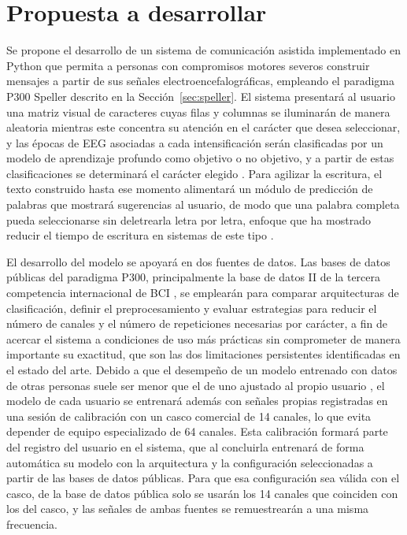 \chapter[PROPUESTA A DESARROLLAR]{Propuesta a desarrollar}
\label{cap:propuesta}

Se propone el desarrollo de un sistema de comunicación asistida implementado en Python que permita
a personas con compromisos motores severos construir mensajes a partir de sus señales
electroencefalográficas, empleando el paradigma P300 Speller descrito en la
Sección~\ref{sec:speller}. El sistema presentará al usuario una matriz visual de caracteres cuyas
filas y columnas se iluminarán de manera aleatoria mientras este concentra su atención en el
carácter que desea seleccionar, y las épocas de EEG asociadas a cada intensificación serán
clasificadas por un modelo de aprendizaje profundo como objetivo o no objetivo, y a partir de estas
clasificaciones se determinará el carácter elegido \cite{farwell1988}. Para agilizar la escritura,
el texto construido hasta ese momento alimentará un módulo de predicción de palabras que mostrará
sugerencias al usuario, de modo que una palabra completa pueda seleccionarse sin deletrearla letra
por letra, enfoque que ha mostrado reducir el tiempo de escritura en sistemas de este tipo
\cite{ryan2011,hong2026}.

El desarrollo del modelo se apoyará en dos fuentes de datos. Las bases de datos públicas del
paradigma P300, principalmente la base de datos II de la tercera competencia internacional de BCI
\cite{blankertz2006}, se emplearán para comparar arquitecturas de clasificación, definir el
preprocesamiento y evaluar estrategias para reducir el número de canales y el número de repeticiones
necesarias por carácter, a fin de acercar el sistema a condiciones de uso más prácticas sin
comprometer de manera importante su exactitud, que son las dos limitaciones persistentes
identificadas en el estado del arte. Debido a que el desempeño de un modelo entrenado con datos de
otras personas suele ser menor que el de uno ajustado al propio usuario \cite{alvarado2021}, el
modelo de cada usuario se entrenará además con señales propias registradas en una sesión de
calibración con un casco comercial de 14 canales, lo que evita depender de equipo especializado de
64 canales. Esta calibración formará parte del registro del usuario en el sistema, que al
concluirla entrenará de forma automática su modelo con la arquitectura y la configuración
seleccionadas a partir de las bases de datos públicas. Para que esa configuración sea válida con el
casco, de la base de datos pública solo se usarán los 14 canales que coinciden con los del casco, y
las señales de ambas fuentes se remuestrearán a una misma frecuencia.

